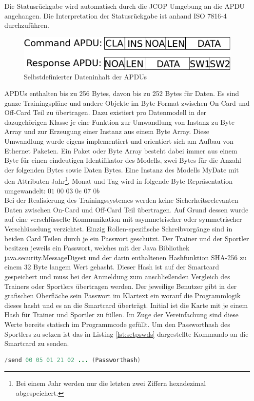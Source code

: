 Die Statusrückgabe wird automatisch durch die JCOP Umgebung an die APDU angehangen. Die Interpretation der Statusrückgabe ist anhand ISO 7816-4 durchzuführen.

\begin{figure}[htb]
\begin{center}
 \includegraphics[width=1\hsize]{./images/myapdu.png}
\end{center}
\caption[Selbstdefinierter Dateninhalt der APDUs]{\label{myapdu}Selbstdefinierter Dateninhalt der APDUs}
\end{figure}

APDUs enthalten bis zu 256 Bytes, davon bis zu 252 Bytes für Daten.
Es sind ganze Trainingspläne und andere Objekte im Byte Format zwischen On-Card und Off-Card Teil zu übertragen. Dazu existiert pro Datenmodell in der dazugehörigen Klasse je eine Funktion zur Umwandlung von Instanz zu Byte Array und zur Erzeugung einer Instanz aus einem Byte Array. Diese Umwandlung  wurde eigens implementiert und orientiert sich am Aufbau von Ethernet Paketen. Ein Paket oder Byte Array besteht dabei immer aus einem Byte für einen eindeutigen Identifikator des Modells, zwei Bytes für die Anzahl der folgenden Bytes sowie Daten Bytes.
Eine Instanz des Modells MyDate mit den Attributen Jahr\footnote{Bei einem Jahr werden nur die letzten zwei Ziffern hexadezimal abgespeichert.}, Monat und Tag wird in folgende Byte Repräsentation umgewandelt: $01$ $00$ $03$ $0e$ $07$ $0b$
\\

Bei der Realisierung des Trainingssystemes werden keine Sicherheitsrelevanten Daten zwischen On-Card und Off-Card Teil übertragen. Auf Grund dessen wurde auf eine verschlüsselte Kommunikation mit asymmetrischer oder symmetrischer Verschlüsselung verzichtet.
Einzig Rollen-spezifische Schreibvorgänge sind in beiden Card Teilen durch je ein Passwort geschützt.
Der Trainer und der Sportler besitzen jeweils ein Passwort, welches mit der Java Bibliothek java.security.MessageDigest und der darin enthaltenen  Hashfunktion SHA-256 zu einem 32 Byte langem Wert gehasht.
Dieser Hash ist auf der Smartcard gespeichert und muss bei der Anmeldung zum anschließenden Vergleich des Trainers oder Sportlers übertragen werden.
Der jeweilige Benutzer gibt in der grafischen Oberfläche sein Passwort im Klartext ein worauf die Programmlogik dieses hasht und es an die Smartcard überträgt.
Initial ist die Karte mit je einem Hash für Trainer und Sportler zu füllen. Im Zuge der Vereinfachung sind diese Werte bereits statisch im Programmcode gefüllt.
Um den Passworthash des Sportlers zu setzen ist das in Listing \ref{lst:setpswds} dargestellte Kommando an die Smartcard zu senden.

\begin{lstlisting}[language=java, captionpos=b, caption=Setzen des Passwortes eines Sportlers in Form eines Kommandos, label=lst:setpswds]
/send 00 05 01 21 02 ... (Passworthash)
\end{lstlisting}